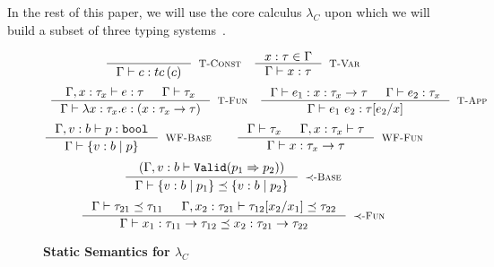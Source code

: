 In the rest of this paper, we will use the core calculus $\lambda_C$
upon which we will build a subset of three typing systems~\cite{LiquidPLDI08, Greenberg12, Vazou13}.


\begin{figure}[ht!]
\medskip {}
\begin{comment}
$$\begin{array}{cc}

\inference
  {  \hastype{\Gamma}{e}{\tau_2} && \isSubType{\Gamma}{\tau_2}{\tau_1} 
  && \isWellFormed{\Gamma}{\tau_1}
  }
  {\hastype{\Gamma}{e}{\tau_1}}
  [\tsub]
\end{array}$$
\end{comment}
$$\begin{array}{cc}
\inference
  {}
  {\hastype{\Gamma}{c}{\tc{c}}}
  [\tconst]
&
\inference
  {x:\tau \in \Gamma}
  {\hastype{\Gamma}{x}{\tau}} 
  [\tvariable]
\end{array}$$
$$\begin{array}{cc}
\inference
  {\hastype{\Gamma, x:\tau_x}{e}{\tau} &&     
  \isWellFormed{\Gamma}{\tau_x}
  }
  {\hastype{\Gamma}{\efunt{x}{\tau_x}{e}}{(\tfun{x}{\tau_x}{\tau})}}
  [\tfunction]
&
\inference
  {\hastype{\Gamma}{e_1}{\tfun{x}{\tau_x}{\tau}} &&
   \hastype{\Gamma}{e_2}{\tau_x}
  }
  {\hastype{\Gamma}{\eapp{e_1}{e_2}}{\tau[e_2/x]}} 
  [\tapp]
\end{array}$$
$$\inference
    {\hastype{\Gamma, v:b}{p}{\tbbool}}
    {\isWellFormed{\Gamma}{\tref{b}{p}}}
    [\wtBase]
\qquad
\inference
    {
    \isWellFormed{\Gamma}{\tau_x} &&
	\isWellFormed{\Gamma, x:\tau_x}{\tau}
    }
    {\isWellFormed{\Gamma}{\tfun{x}{\tau_x}{\tau}}}
    [\wtFun]
$$
\medskip {}
$$
\inference
   {(\Gamma, v:b \vdash \texttt{Valid}(p_1 \Rightarrow p_2))}
   {\isSubType{\Gamma}{\tref{b}{p_1}}{\tref{b}{p_2}}}
   [\tsubBase]
$$
$$
\inference
   {\isSubType{\Gamma}{\tau_{21}}{\tau_{11}} &
	\isSubType{\Gamma, x_2:{\tau_{21}}}{\SUBST{\tau_{12}}{x_1}{x_2}}{\tau_{22}}	
   }
   {\isSubType{\Gamma}
	  {\tfun{x_1}{\tau_{11}}{\tau_{12}}}
	  {\tfun{x_2}{\tau_{21}}{\tau_{22}}}
}[\tsubFun]
$$
\caption{\textbf{Static Semantics for $\lambda_C$}}
\label{fig:corerules}
\end{figure}